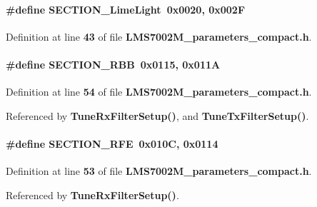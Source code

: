 \paragraph[{S\+E\+C\+T\+I\+O\+N\+\_\+\+Lime\+Light}]{\setlength{\rightskip}{0pt plus 5cm}\#define S\+E\+C\+T\+I\+O\+N\+\_\+\+Lime\+Light~0x0020, 0x002F}\label{LMS7002M__parameters__compact_8h_ad8659b483e7ab4aebd5dec5ecb456cb8}


Definition at line {\bf 43} of file {\bf L\+M\+S7002\+M\+\_\+parameters\+\_\+compact.\+h}.

\paragraph[{S\+E\+C\+T\+I\+O\+N\+\_\+\+R\+BB}]{\setlength{\rightskip}{0pt plus 5cm}\#define S\+E\+C\+T\+I\+O\+N\+\_\+\+R\+BB~0x0115, 0x011A}\label{LMS7002M__parameters__compact_8h_a02ee3b91ad2d9258ea569d50a8d9196a}


Definition at line {\bf 54} of file {\bf L\+M\+S7002\+M\+\_\+parameters\+\_\+compact.\+h}.



Referenced by {\bf Tune\+Rx\+Filter\+Setup()}, and {\bf Tune\+Tx\+Filter\+Setup()}.

\paragraph[{S\+E\+C\+T\+I\+O\+N\+\_\+\+R\+FE}]{\setlength{\rightskip}{0pt plus 5cm}\#define S\+E\+C\+T\+I\+O\+N\+\_\+\+R\+FE~0x010\+C, 0x0114}\label{LMS7002M__parameters__compact_8h_a174c1c23fb6ac404830ce91a255e66cc}


Definition at line {\bf 53} of file {\bf L\+M\+S7002\+M\+\_\+parameters\+\_\+compact.\+h}.



Referenced by {\bf Tune\+Rx\+Filter\+Setup()}.

